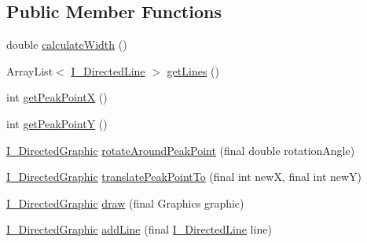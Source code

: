 \subsection*{Public Member Functions}
\begin{DoxyCompactItemize}
\item 
double \hyperlink{interfaceorg_1_1tzi_1_1use_1_1gui_1_1views_1_1diagrams_1_1util_1_1_i___directed_graphic_a28062f9a4bc313779136f5336af28e2b}{calculate\-Width} ()
\item 
Array\-List$<$ \hyperlink{interfaceorg_1_1tzi_1_1use_1_1gui_1_1views_1_1diagrams_1_1util_1_1_i___directed_line}{I\-\_\-\-Directed\-Line} $>$ \hyperlink{interfaceorg_1_1tzi_1_1use_1_1gui_1_1views_1_1diagrams_1_1util_1_1_i___directed_graphic_a462395c8903ccb16b8f0c54eb22d1f4e}{get\-Lines} ()
\item 
int \hyperlink{interfaceorg_1_1tzi_1_1use_1_1gui_1_1views_1_1diagrams_1_1util_1_1_i___directed_graphic_a3b74cc8c873c726b1bb5ada75d343f4f}{get\-Peak\-Point\-X} ()
\item 
int \hyperlink{interfaceorg_1_1tzi_1_1use_1_1gui_1_1views_1_1diagrams_1_1util_1_1_i___directed_graphic_acebfc1538e11f2a76360938d9d4ff651}{get\-Peak\-Point\-Y} ()
\item 
\hyperlink{interfaceorg_1_1tzi_1_1use_1_1gui_1_1views_1_1diagrams_1_1util_1_1_i___directed_graphic}{I\-\_\-\-Directed\-Graphic} \hyperlink{interfaceorg_1_1tzi_1_1use_1_1gui_1_1views_1_1diagrams_1_1util_1_1_i___directed_graphic_a98d05b06518618a00d7767440ed6e3b1}{rotate\-Around\-Peak\-Point} (final double rotation\-Angle)
\item 
\hyperlink{interfaceorg_1_1tzi_1_1use_1_1gui_1_1views_1_1diagrams_1_1util_1_1_i___directed_graphic}{I\-\_\-\-Directed\-Graphic} \hyperlink{interfaceorg_1_1tzi_1_1use_1_1gui_1_1views_1_1diagrams_1_1util_1_1_i___directed_graphic_a17c5edbdf1578256728703c62a618366}{translate\-Peak\-Point\-To} (final int new\-X, final int new\-Y)
\item 
\hyperlink{interfaceorg_1_1tzi_1_1use_1_1gui_1_1views_1_1diagrams_1_1util_1_1_i___directed_graphic}{I\-\_\-\-Directed\-Graphic} \hyperlink{interfaceorg_1_1tzi_1_1use_1_1gui_1_1views_1_1diagrams_1_1util_1_1_i___directed_graphic_ade105d21aaa02ebaeca3f7103d132c06}{draw} (final Graphics graphic)
\item 
\hyperlink{interfaceorg_1_1tzi_1_1use_1_1gui_1_1views_1_1diagrams_1_1util_1_1_i___directed_graphic}{I\-\_\-\-Directed\-Graphic} \hyperlink{interfaceorg_1_1tzi_1_1use_1_1gui_1_1views_1_1diagrams_1_1util_1_1_i___directed_graphic_a2690b19d99c0b97e0fab80197b6a1409}{add\-Line} (final \hyperlink{interfaceorg_1_1tzi_1_1use_1_1gui_1_1views_1_1diagrams_1_1util_1_1_i___directed_line}{I\-\_\-\-Directed\-Line} line)

\end{DoxyCompactItemize}

